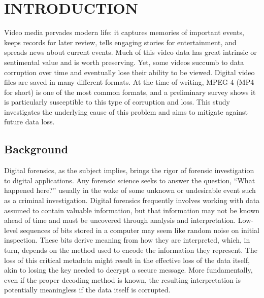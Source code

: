 %
%
%
%
%



\chapter{\uppercase{Introduction}}

Video media pervades modern life: it captures memories of important events, keeps records for later review, tells engaging stories for entertainment, and spreads news about current events. Much of this video data has great intrinsic or sentimental value and is worth preserving. Yet, some videos succumb to data corruption over time and eventually lose their ability to be viewed. Digital video files are saved in many different formats. At the time of writing, MPEG-4 (MP4 for short) is one of the most common formats, and a preliminary survey shows it is particularly susceptible to this type of corruption and loss. This study investigates the underlying cause of this problem and aims to mitigate against future data loss.

\section{Background}

Digital forensics, as the subject implies, brings the rigor of forensic investigation to digital applications. Any forensic science seeks to answer the question, ``What happened here?'' usually in the wake of some unknown or undesirable event such as a criminal investigation. Digital forensics frequently involves working with data assumed to contain valuable information, but that information may not be known ahead of time and must be uncovered through analysis and interpretation. Low-level sequences of bits stored in a computer may seem like random noise on initial inspection. These bits derive meaning from how they are interpreted, which, in turn, depends on the method used to encode the information they represent. The loss of this critical metadata might result in the effective loss of the data itself, akin to losing the key needed to decrypt a secure message. More fundamentally, even if the proper decoding method is known, the resulting interpretation is potentially meaningless if the data itself is corrupted.

